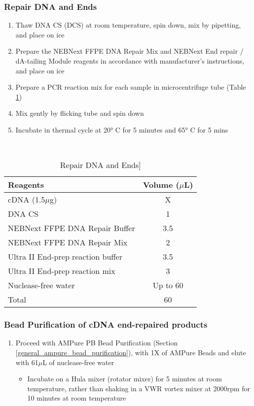 \subsubsection{Repair DNA and Ends}
\begin{enumerate}
	\item Thaw DNA CS (DCS) at room temperature, spin down, mix by pipetting, and place on ice
	\item Prepare the NEBNext FFPE DNA Repair Mix and NEBNext End repair / dA-tailing Module reagents in accordance with manufacturer’s instructions, and place on ice
	\item Prepare a PCR reaction mix for each sample in microcentrifuge tube (Table \ref{tab:ont_repair_dna_ends})
	\item Mix gently by flicking tube and spin down 
	\item Incubate in thermal cycle at 20° C for 5 minutes and 65° C for 5 mins
\end{enumerate}
\
\begin{table}[h]
	\centering
	\begin{tabularx}{0.8\textwidth}{lc}
		\toprule
		Reagents                          & Volume ($\mu$L) \\ \midrule
		cDNA (1.5$\mu$g)                  & X           \\
		DNA CS                            & 1           \\
		NEBNext FFPE DNA Repair Buffer    & 3.5         \\
		NEBNext FFPE DNA Repair Mix       & 2           \\
		Ultra II End-prep reaction buffer & 3.5         \\
		Ultra II End-prep reaction mix    & 3           \\
		Nuclease-free water               & Up to 60    \\
		Total                             & 60          \\ \bottomrule
	\end{tabularx}
	\caption{Repair DNA and Ends]}
	\label{tab:ont_repair_dna_ends}
\end{table}

\subsubsection{Bead Purification of cDNA end-repaired products}
\begin{enumerate}
	\item	Proceed with AMPure PB Bead Purification (Section \ref{general_ampure_bead_purification}), with 1X of AMPure Beads and elute with 61$\mu$L of nuclease-free water
		\begin{itemize}
		\item Incubate on a Hula mixer (rotator mixer) for 5 minutes at room temperature, rather than shaking in a VWR vortex mixer at 2000rpm for 10 minutes at room temperature 
	\end{itemize} 
\end{enumerate}

